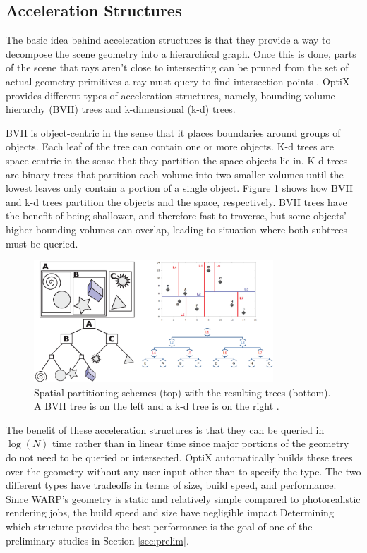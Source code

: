 \subsection{Acceleration Structures}

The basic idea behind acceleration structures is that they provide a way to decompose the scene geometry into a hierarchical graph.  Once this is done, parts of the scene that rays aren't close to intersecting can be pruned from the set of actual geometry primitives a ray must query to find intersection points \cite{optix}.  OptiX provides different types of acceleration structures, namely, bounding volume hierarchy (BVH) trees and k-dimensional (k-d) trees.

BVH is object-centric in the sense that it places boundaries around groups of objects.  Each leaf of the tree can contain one or more objects. K-d trees are space-centric in the sense that they partition the space objects lie in.  K-d trees are binary trees that partition each volume into two smaller volumes until the lowest leaves only contain a portion of a single object.  Figure \ref{bvh_kd} shows how BVH and k-d trees partition the objects and the space, respectively.  BVH trees have the benefit of being shallower, and therefore fast to traverse, but some objects' higher bounding volumes can overlap, leading to situation where both subtrees must be queried.

\begin{figure}[h!] 
\centering
\includegraphics[width=0.8\textwidth, trim= 8cm 0cm 0cm 0cm ]{graphics/bvh_kd.eps}
\caption[Spatial partitioning schemes with the resulting trees.]{Spatial partitioning schemes (top) with the resulting trees (bottom). A BVH tree \cite{wikimedia_bvh} is on the left and a k-d tree is on the right \cite{wikimedia_kd}.   \label{bvh_kd}}
\end{figure}

The benefit of these acceleration structures is that they can be queried in $\log(N)$ time rather than in linear time since major portions of the geometry do not need to be queried or intersected.  OptiX automatically builds these trees over the geometry without any user input other than to specify the type.  The two different types have tradeoffs in terms of size, build speed, and performance. Since WARP's geometry is static and relatively simple compared to photorealistic rendering jobs, the build speed and size have negligible impact%
Determining which structure provides the best performance is the goal of one of the preliminary studies in Section \ref{sec:prelim}.  

